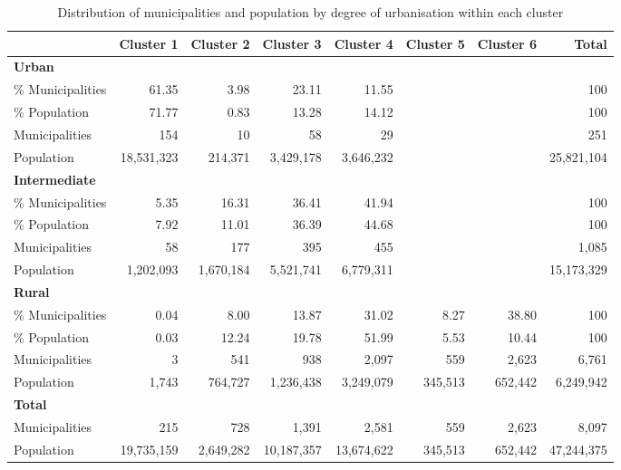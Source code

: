 \documentclass[a4paper,11pt,oneside]{article}
\begin{document}
\begin{table}%
\centering
\caption{Distribution of municipalities and population by degree of urbanisation within each cluster}
\label{tbl:8}
\footnotesize
\begin{tabular}{lrrrrrr|r}
\toprule
 & Cluster 1 & Cluster 2 & Cluster 3 & Cluster 4 & Cluster 5 & Cluster 6 & \textbf{Total} \\
\midrule
\textbf{Urban} & & & & & & & \\
\quad \% Municipalities & 61.35 & 3.98 & 23.11 & 11.55 &  &  & 100 \\
\quad \% Population     & 71.77 & 0.83 & 13.28 & 14.12 &  &  & 100 \\
\quad Municipalities & 154 & 10 & 58 & 29 &  &  & 251 \\
\quad Population    & 18,531,323 & 214,371 & 3,429,178 & 3,646,232 &  &  & 25,821,104 \\
\midrule
\textbf{Intermediate} & & & & & & & \\
\quad \% Municipalities & 5.35 & 16.31 & 36.41 & 41.94 &  &  & 100 \\
\quad \% Population     & 7.92 & 11.01 & 36.39 & 44.68 &  &  & 100 \\
\quad Municipalities  & 58 & 177 & 395 & 455 &  &  & 1,085 \\
\quad Population     & 1,202,093 & 1,670,184 & 5,521,741 & 6,779,311 &  &  & 15,173,329 \\
\midrule
\textbf{Rural} & & & & & & & \\
\quad \% Municipalities & 0.04 & 8.00 & 13.87 & 31.02 & 8.27 & 38.80 & 100 \\
\quad \% Population     & 0.03 & 12.24 & 19.78 & 51.99 & 5.53 & 10.44 & 100 \\
\quad Municipalities  & 3 & 541 & 938 & 2,097 & 559 & 2,623 & 6,761 \\
\quad Population    & 1,743 & 764,727 & 1,236,438 & 3,249,079 & 345,513 & 652,442 & 6,249,942 \\
\midrule
\textbf{Total} & & & & & & & \\
\quad Municipalities  & 215 & 728 & 1,391 & 2,581 & 559 & 2,623 & 8,097 \\
\quad Population    & 19,735,159 & 2,649,282 & 10,187,357 & 13,674,622 & 345,513 & 652,442 & 47,244,375 \\
\bottomrule
\end{tabular}
\end{table}


\pagebreak
\clearpage
\end{document}
